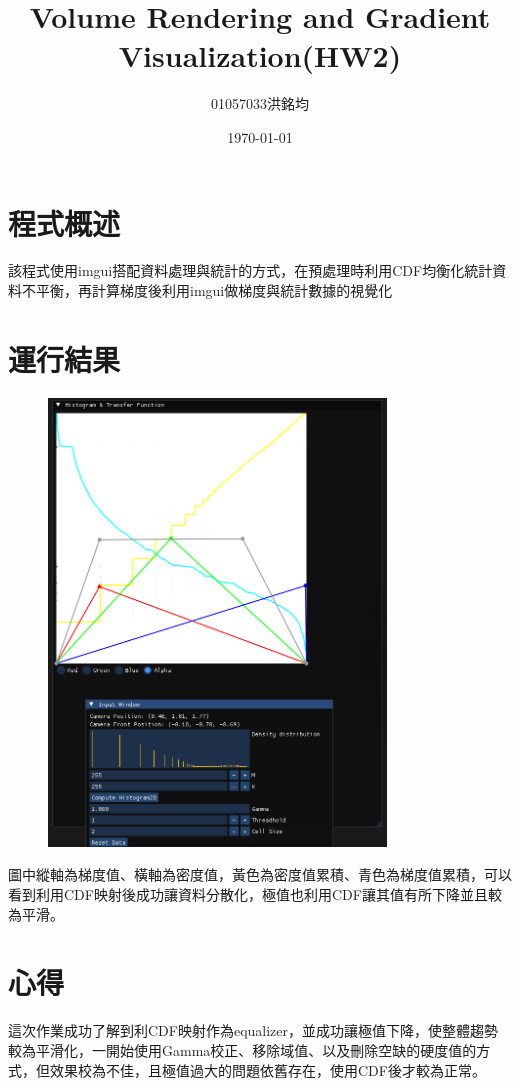 \documentclass[a4paper,12pt]{article}
\title{Volume Rendering and Gradient Visualization(HW2)}
\author{01057033洪銘均}
\date{\today}
\begin{document}
\maketitle
\tableofcontents
\newpage

\section{程式概述}
該程式使用imgui搭配資料處理與統計的方式，在預處理時利用CDF均衡化統計資料不平衡，再計算梯度後利用imgui做梯度與統計數據的視覺化



\section{運行結果}

\begin{figure}[h]
    \centering
    \includegraphics[width=0.8\textwidth]{img/img2.png}
\end{figure}
圖中縱軸為梯度值、橫軸為密度值，黃色為密度值累積、青色為梯度值累積，可以看到利用CDF映射後成功讓資料分散化，極值也利用CDF讓其值有所下降並且較為平滑。

\section{心得}
這次作業成功了解到利CDF映射作為equalizer，並成功讓極值下降，使整體趨勢較為平滑化，一開始使用Gamma校正、移除域值、以及刪除空缺的硬度值的方式，但效果校為不佳，且極值過大的問題依舊存在，使用CDF後才較為正常。
\end{document}

